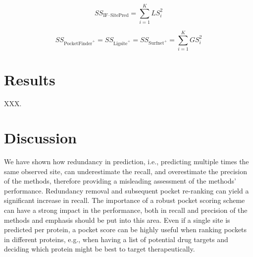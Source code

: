 \begin{equation}
SS_{\text{IF--SitePred}} = \sum_{i=1}^{K} LS_i^2
\label{eq:IFSP_pocket_score}
\end{equation}

\begin{equation}
SS_{\text{PocketFinder}^+} = SS_{\text{Ligsite}^+} = SS_{\text{Surfnet}^+} = \sum_{i=1}^{K} GS_i^2
\label{eq:leagcy_methos_pocket_score}
\end{equation}

\FloatBarrier

\section{Results}

XXX.

\section{Discussion}

We have shown how redundancy in prediction, i.e., predicting multiple times the same observed site, can underestimate the recall, and overestimate the precision of the methods, therefore providing a misleading assessment of the methods’ performance. Redundancy removal and subsequent pocket re-ranking can yield a significant increase in recall. The importance of a robust pocket scoring scheme can have a strong impact in the performance, both in recall and precision of the methods and emphasis should be put into this area. Even if a single site is predicted per protein, a pocket score can be highly useful when ranking pockets in different proteins, e.g., when having a list of potential drug targets and deciding which protein might be best to target therapeutically.

